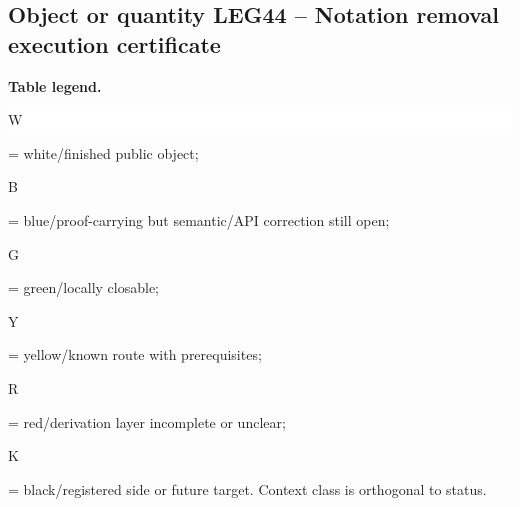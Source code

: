 \subsection*{Object or quantity LEG44 -- Notation removal execution certificate}
\hypertarget{objproof:LEG44}{}
\par\smallskip\noindent\begin{minipage}{0.99\linewidth}\footnotesize\raggedright\textbf{Table legend.} \colorbox{white}{\strut W} = white/finished public object; \colorbox{cyan!20}{\strut B} = blue/proof-carrying but semantic/API correction still open; \colorbox{green!18}{\strut G} = green/locally closable; \colorbox{yellow!25}{\strut Y} = yellow/known route with prerequisites; \colorbox{red!20}{\strut R} = red/derivation layer incomplete or unclear; \colorbox{black!18}{\strut K} = black/registered side or future target. Context class is orthogonal to status.\end{minipage}\par\vspace{0.25em}
